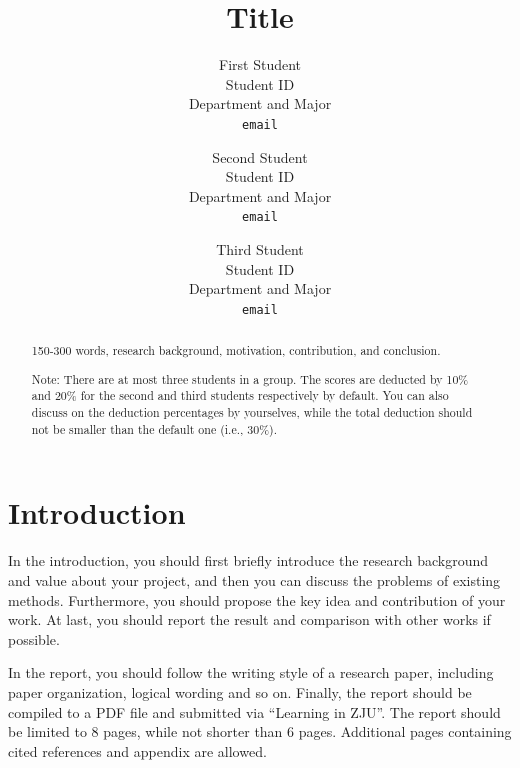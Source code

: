 \documentclass[10pt,twocolumn,letterpaper]{article}
\begin{document}
\title{Title}

\author{First Student\\
    Student ID\\
    Department and Major\\
    {\tt\small email}
\and
    Second Student\\
	Student ID\\
	Department and Major\\
	{\tt\small email}
\and
    Third Student\\
	Student ID\\
	Department and Major\\
	{\tt\small email}
}
\maketitle

\begin{abstract}
  150-300 words, research background, motivation, contribution, and conclusion. 
  
  {\color{red} Note:
  There are at most three students in a group. The scores are deducted by 10\% and 20\% for the second and third students respectively by default. You can also discuss on the deduction percentages by yourselves, while the total deduction should not be smaller than the default one (i.e., 30\%).}
\end{abstract}

\section{Introduction}
\label{sec:intro}

In the introduction, you should first briefly introduce the research background and value about your project, and then you can discuss the problems of existing methods. Furthermore, you should propose the key idea and contribution of your work. At last, you should report the result and comparison with other works if possible.

In the report, you should follow the writing style of a research paper, including paper organization, logical wording and so on. Finally, the report should be compiled to a PDF file and submitted via ``Learning in ZJU''. The report should be limited to 8 pages, while not shorter than 6 pages. Additional pages containing cited references and appendix are allowed. 


\end{document}
